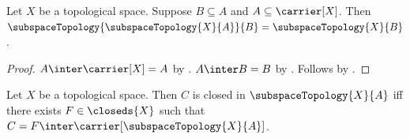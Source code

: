 \begin{corollary}\label{nested_subspace_topology}
    Let $X$ be a topological space.
    Suppose $B\subseteq A$ and $A\subseteq\carrier[X]$.
    Then $\subspaceTopology{\subspaceTopology{X}{A}}{B}
        =\subspaceTopology{X}{B}$.
\end{corollary}
\begin{proof}
    $A\inter\carrier[X]=A$ by .
    $A\inter B=B$ by .
    Follows by .
\end{proof}

\begin{theorem}\label{subspace_closed_iff}
    Let $X$ be a topological space.
    Then $C$ is closed in $\subspaceTopology{X}{A}$ iff
        there exists $F\in\closeds{X}$ such that
            $C=F\inter\carrier[\subspaceTopology{X}{A}]$.
\end{theorem}
